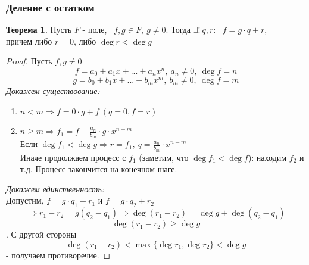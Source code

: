 \documentclass[a4paper, 12pt]{article}
\theoremstyle{definition}
\newtheorem*{theorem}{Теорема}
\begin{document}
  \subsubsection{Деление с остатком}
  \begin{theorem}
    Пусть $F$ - поле, \ $f, g \in F,\ g\neq 0 $. Тогда $\exists ! \ q, r$: \ $f = g \cdot q + r$, \\причем либо $r=0$, либо $\deg r < \deg g$       
  \end{theorem}
  \begin{proof}
    Пусть $f, g \neq 0$$$f = a_0 + a_1x+...+a_nx^n, \ a_n \neq 0, \ \deg f = n$$ $$g = b_0 + b_1x+...+b_mx^m, \ b_m \neq 0, \ \deg f = m$$ 
    \textit{Докажем существование:} 
    \begin{enumerate}
      \item $n<m \Longrightarrow f = 0 \cdot g + f \ (q=0, f = r)$
      \item $n\geq m \Longrightarrow f_1 = f - \frac{a_n}{b_m} \cdot g \cdot x^{n-m}$ \\
      Если $\deg f_1 < \deg g \Longrightarrow r = f_1, \ q = \frac{a_n}{b_m}\cdot x^{n-m}$ \\
      Иначе продолжаем процесс с $f_1$ (заметим, что $\deg f_1 < \deg f$): находим $f_2 $ и т.д. Процесс закончится на конечном шаге.  
    \end{enumerate}
    \textit{Докажем единственность:}  \\
    Допустим, $ f = g \cdot q_1 + r_1$ и $f = g \cdot q_2 + r_2$ $$  \Longrightarrow r_1 - r_2 = g(q_2 - q_1) \Longrightarrow \deg (r_1-r_2) = \deg g + \deg (q_2 - q_1) $$ $$\deg(r_1 - r_2) \geq \deg g$$. С другой стороны $$\deg (r_1-r_2) < \max \{\deg r_1, \deg r_2\} < \deg g$$ - получаем противоречие.   
  \end{proof} 
\end{document}
